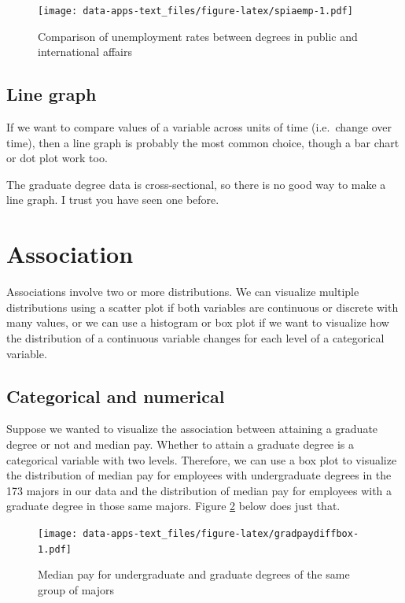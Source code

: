 \documentclass[
]{book}
\begin{document}
\begin{figure}
\centering
\texttt{[image: data-apps-text\_files/figure-latex/spiaemp-1.pdf]}
\caption{\label{fig:spiaemp}Comparison of unemployment rates between degrees in public and international affairs}
\end{figure}

\hypertarget{line-graph}{%
\subsection{Line graph}\label{line-graph}}

If we want to compare values of a variable across units of time (i.e.~change over time), then a line graph is probably the most common choice, though a bar chart or dot plot work too.

The graduate degree data is cross-sectional, so there is no good way to make a line graph. I trust you have seen one before.

\hypertarget{association}{%
\section{Association}\label{association}}

Associations involve two or more distributions. We can visualize multiple distributions using a scatter plot if both variables are continuous or discrete with many values, or we can use a histogram or box plot if we want to visualize how the distribution of a continuous variable changes for each level of a categorical variable.

\hypertarget{categorical-and-numerical}{%
\subsection{Categorical and numerical}\label{categorical-and-numerical}}

Suppose we wanted to visualize the association between attaining a graduate degree or not and median pay. Whether to attain a graduate degree is a categorical variable with two levels. Therefore, we can use a box plot to visualize the distribution of median pay for employees with undergraduate degrees in the 173 majors in our data and the distribution of median pay for employees with a graduate degree in those same majors. Figure \ref{fig:gradpaydiffbox} below does just that.

\begin{figure}
\centering
\texttt{[image: data-apps-text\_files/figure-latex/gradpaydiffbox-1.pdf]}
\caption{\label{fig:gradpaydiffbox}Median pay for undergraduate and graduate degrees of the same group of majors}
\end{figure}
\end{document}
